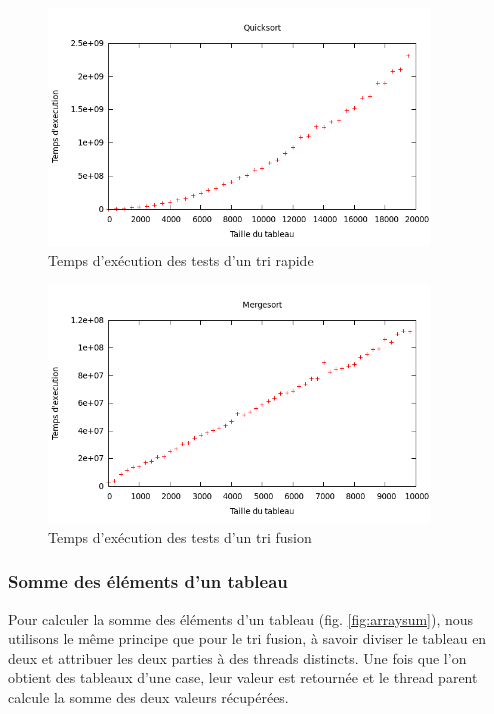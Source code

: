 \begin{figure}[H]
\centering
\includegraphics[width=0.9\textwidth]{quicksort.png}
\caption{Temps d'exécution des tests d'un tri rapide}
\label{fig:quicksort}
\end{figure}

\begin{figure}[H]
\centering
\includegraphics[width=0.9\textwidth]{mergesort.png}
\caption{Temps d'exécution des tests d'un tri fusion}
\label{fig:mergesort}
\end{figure}

\subsubsection{Somme des éléments d'un tableau} Pour calculer la somme des
éléments d'un tableau (fig. \ref{fig:arraysum}), nous utilisons le même principe que pour le tri fusion,
à savoir diviser le tableau en deux et attribuer les deux parties à des threads
distincts. Une fois que l'on obtient des tableaux d'une case, leur valeur est
retournée et le thread parent calcule la somme des deux valeurs récupérées.

